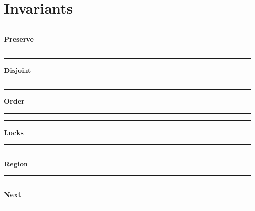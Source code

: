 \chapter{Invariants}


\label{appendix::inv:full}



\begin{center}\rule{4cm}{0.4pt}  \textbf{Preserve}  \rule{4cm}{0.4pt}\end{center}
\label{inv::full:preserve}
\small{}

\normalsize{}


\begin{center}\rule{4cm}{0.4pt}  \textbf{Disjoint}  \rule{4cm}{0.4pt}\end{center}
\label{inv::full:disjoint}
\small{}

\normalsize{}


\begin{center}\rule{4cm}{0.4pt}  \textbf{Order}  \rule{4cm}{0.4pt}\end{center}
\label{inv::full:order}
\small{}

\normalsize{}


\begin{center}\rule{4cm}{0.4pt}  \textbf{Locks}  \rule{4cm}{0.4pt}\end{center}
\label{inv::full:lock}
\small{}

\normalsize{}


\begin{center}\rule{4cm}{0.4pt}  \textbf{Region}  \rule{4cm}{0.4pt}\end{center}
\label{inv::full:region}
\small{}

\normalsize{}


\begin{center}\rule{4cm}{0.4pt}  \textbf{Next}  \rule{4cm}{0.4pt}\end{center}
\label{inv::full:next}
\small{}

\normalsize{}


